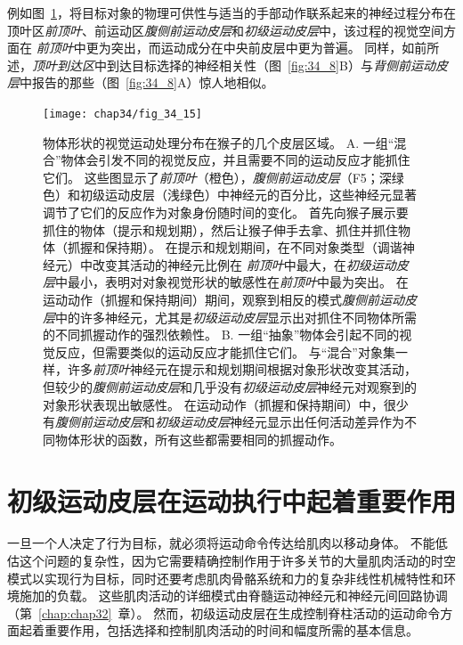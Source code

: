 例如图~\ref{fig:34_15}，将目标对象的物理可供性与适当的手部动作联系起来的神经过程分布在顶叶区\textit{前顶叶}、前运动区\textit{腹侧前运动皮层}和\textit{初级运动皮层}中，该过程的视觉空间方面在 \textit{前顶叶}中更为突出，而运动成分在中央前皮层中更为普遍。
同样，如前所述，\textit{顶叶到达区}中到达目标选择的神经相关性（图~\ref{fig:34_8}B）与\textit{背侧前运动皮层}中报告的那些（图~\ref{fig:34_8}A）惊人地相似。


\begin{figure}[htbp]
	\centering
	\texttt{[image: chap34/fig\_34\_15]}
	\caption{物体形状的视觉运动处理分布在猴子的几个皮层区域\cite{schaffelhofer2016object}。
		A. 一组“混合”物体会引发不同的视觉反应，并且需要不同的运动反应才能抓住它们。
		这些图显示了\textit{前顶叶}（橙色），\textit{腹侧前运动皮层}（F5；深绿色）和初级运动皮层（浅绿色）中神经元的百分比，这些神经元显著调节了它们的反应作为对象身份随时间的变化。
		首先向猴子展示要抓住的物体（提示和规划期），然后让猴子伸手去拿、抓住并抓住物体（抓握和保持期）。
		在提示和规划期间，在不同对象类型（调谐神经元）中改变其活动的神经元比例在 \textit{前顶叶}中最大，在\textit{初级运动皮层}中最小，表明对对象视觉形状的敏感性在\textit{前顶叶}中最为突出。
		在运动动作（抓握和保持期间）期间，观察到相反的模式\textit{腹侧前运动皮层}中的许多神经元，尤其是\textit{初级运动皮层}显示出对抓住不同物体所需的不同抓握动作的强烈依赖性。
		B. 一组“抽象”物体会引起不同的视觉反应，但需要类似的运动反应才能抓住它们。
		与“混合”对象集一样，许多\textit{前顶叶}神经元在提示和规划期间根据对象形状改变其活动，但较少的\textit{腹侧前运动皮层}和几乎没有\textit{初级运动皮层}神经元对观察到的对象形状表现出敏感性。
		在运动动作（抓握和保持期间）中，很少有\textit{腹侧前运动皮层}和\textit{初级运动皮层}神经元显示出任何活动差异作为不同物体形状的函数，所有这些都需要相同的抓握动作。}
	\label{fig:34_15}
\end{figure}



\section{初级运动皮层在运动执行中起着重要作用}

一旦一个人决定了行为目标，就必须将运动命令传达给肌肉以移动身体。
不能低估这个问题的复杂性，因为它需要精确控制作用于许多关节的大量肌肉活动的时空模式以实现行为目标，同时还要考虑肌肉骨骼系统和力的复杂非线性机械特性和环境施加的负载。
这些肌肉活动的详细模式由脊髓运动神经元和神经元间回路协调（第~\ref{chap:chap32}~章）。
然而，初级运动皮层在生成控制脊柱活动的运动命令方面起着重要作用，包括选择和控制肌肉活动的时间和幅度所需的基本信息。



